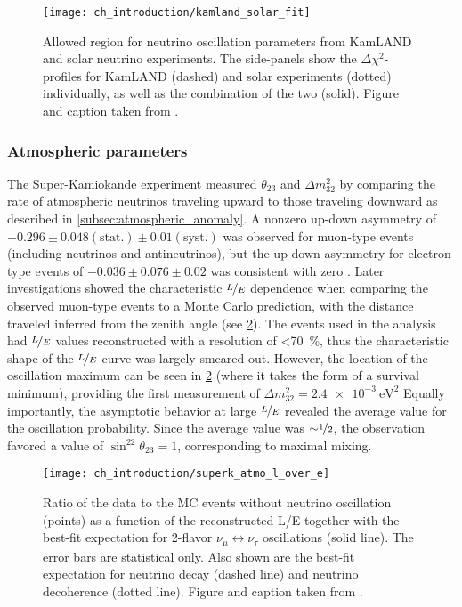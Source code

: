 \begin{figure}
    \centering
    \texttt{[image: ch\_introduction/kamland\_solar\_fit]}
    \caption[Solar oscillation parameters allowed region]{
        Allowed region for neutrino oscillation parameters from KamLAND and solar
        neutrino experiments.
        The side-panels show the $\Delta \chi^2$-profiles
        for KamLAND (dashed) and solar experiments (dotted) individually,
        as well as the combination of the two (solid).
        Figure and caption taken from \cite{kamland_latest}.
    }
    \label{fig:kamland_plus_solar}
\end{figure}

\subsubsection{Atmospheric parameters}
The Super-Kamiokande experiment measured $\theta_{23}$ and $\Delta m^2_{32}$
by comparing the rate of atmospheric neutrinos
traveling upward to those traveling downward
as described in \cref{subsec:atmospheric_anomaly}.
A nonzero up-down asymmetry of $-0.296\pm0.048(\text{stat.})\pm0.01(\text{syst.})$
was observed for muon-type events (including neutrinos and antineutrinos),
but the up-down asymmetry for electron-type events
of $-0.036\pm0.076\pm0.02$ was consistent with zero \cite{superk1998}.
Later investigations \cite{superk2004} showed the characteristic $\nicefrac{L}{E}$
dependence when comparing the observed muon-type events
to a Monte Carlo prediction,
with the distance traveled inferred from the zenith angle
(see \cref{fig:superk_l_over_e}).
The events used in the analysis had $\nicefrac{L}{E}$ values reconstructed
with a resolution of \SI{<70}{\percent},
thus the characteristic shape of the $\nicefrac{L}{E}$ curve
was largely smeared out.
However, the location of the oscillation maximum
can be seen in \cref{fig:superk_l_over_e}
(where it takes the form of a survival minimum),
providing the first measurement of $\Delta m^2_{32} = \SI{2.4e-3}{\eV\squared}$
Equally importantly, the asymptotic behavior
at large $\nicefrac{L}{E}$ revealed
the average value for the oscillation probability.
Since the average value was ${\sim}\nicefrac{1}{2}$,
the observation favored a value of $\sin^22\theta_{23} = 1$,
corresponding to maximal mixing.

\begin{figure}
    \centering
    \texttt{[image: ch\_introduction/superk\_atmo\_l\_over\_e]}
    \caption[Super-Kamiokande atmospheric L/E distribution]{
        Ratio of the data to the MC events without neutrino oscillation (points)
        as a function of the reconstructed L/E together with
        the best-fit expectation for 2-flavor $\nu_\mu\leftrightarrow\nu_\tau$
        oscillations (solid line).
        The error bars are statistical only.
        Also shown are the best-fit expectation for neutrino decay (dashed line)
        and neutrino decoherence (dotted line).
        Figure and caption taken from \cite{superk2004}.
    }
    \label{fig:superk_l_over_e}
\end{figure}

